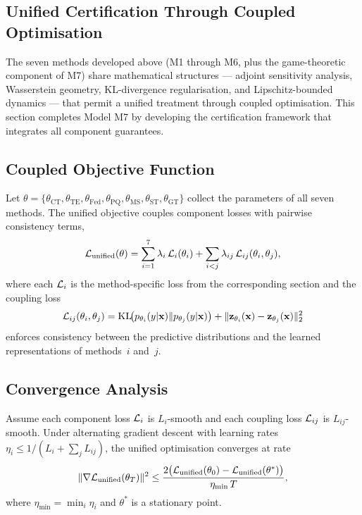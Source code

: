 \subsection{Unified Certification Through Coupled Optimisation}
\label{sec:unified}

The seven methods developed above (M1 through M6, plus the game-theoretic component of M7) share mathematical structures — adjoint sensitivity analysis, Wasserstein geometry, KL-divergence regularisation, and Lipschitz-bounded dynamics — that permit a unified treatment through coupled optimisation. This section completes Model M7 by developing the certification framework that integrates all component guarantees.

\subsection{Coupled Objective Function}

Let $\theta=\{\theta_{\mathrm{CT}},\theta_{\mathrm{TE}},\theta_{\mathrm{Fed}},\theta_{\mathrm{PQ}},\theta_{\mathrm{MS}},\theta_{\mathrm{ST}},\theta_{\mathrm{GT}}\}$ collect the parameters of all seven methods. The unified objective couples component losses with pairwise consistency terms,
\begin{equation}
\mathcal{L}_{\mathrm{unified}}(\theta)
= \sum_{i=1}^{7}\lambda_i\,\mathcal{L}_i(\theta_i)
+ \sum_{i<j}\lambda_{ij}\,\mathcal{L}_{ij}(\theta_i,\theta_j),
\label{eq:unified_obj}
\end{equation}
where each $\mathcal{L}_i$ is the method-specific loss from the corresponding section and the coupling loss
\begin{equation}
\mathcal{L}_{ij}(\theta_i,\theta_j)
= \mathrm{KL}\!\bigl(p_{\theta_i}(y|\mathbf{x})\|p_{\theta_j}(y|\mathbf{x})\bigr)
+ \|\mathbf{z}_{\theta_i}(\mathbf{x})-\mathbf{z}_{\theta_j}(\mathbf{x})\|_2^2
\label{eq:unified_coupling}
\end{equation}
enforces consistency between the predictive distributions and the learned representations of methods~$i$ and~$j$.

\subsection{Convergence Analysis}

\begin{theorem}
\label{thm:unified}
Assume each component loss $\mathcal{L}_i$ is $L_i$-smooth and each coupling loss $\mathcal{L}_{ij}$ is $L_{ij}$-smooth. Under alternating gradient descent with learning rates $\eta_i\le 1/(L_i+\sum_j L_{ij})$, the unified optimisation converges at rate
\begin{equation}
\|\nabla\mathcal{L}_{\mathrm{unified}}(\theta_T)\|^2
\le \frac{2\bigl(\mathcal{L}_{\mathrm{unified}}(\theta_0)
  -\mathcal{L}_{\mathrm{unified}}(\theta^*)\bigr)}{\eta_{\min}\,T},
\label{eq:unified_conv}
\end{equation}
where $\eta_{\min}=\min_i\eta_i$ and $\theta^*$ is a stationary point.
\end{theorem}

